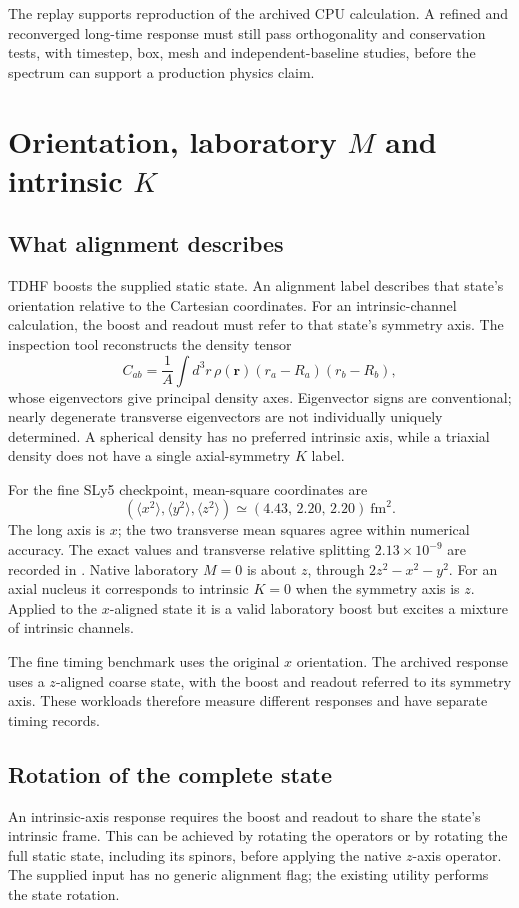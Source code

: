 \documentclass[11pt,a4paper]{article}
\newcommand{\ev}[1]{\path{#1.json}}
\newcommand{\sepsection}[1]{\FloatBarrier\section{#1}}
\begin{document}
The replay supports reproduction of the archived CPU calculation.
A refined and reconverged long-time response must still pass
orthogonality and conservation tests, with timestep, box, mesh and
independent-baseline studies, before the spectrum can support a
production physics claim.


\sepsection{Orientation, laboratory \texorpdfstring{$M$}{M} and intrinsic \texorpdfstring{$K$}{K}}
\label{sec:orientation}
\subsection{What alignment describes}
TDHF boosts the supplied static state. An alignment label describes that
state's orientation relative to the Cartesian coordinates. For an
intrinsic-channel calculation, the boost and readout must refer to that
state's symmetry axis.
The inspection tool reconstructs the density tensor
\begin{equation}
 C_{ab}=\frac{1}{A}\int d^3r\,\rho(\mathbf r)
 (r_a-R_a)(r_b-R_b),
\end{equation}
whose eigenvectors give principal density axes. Eigenvector signs are
conventional; nearly degenerate transverse eigenvectors are not individually
uniquely determined. A spherical density has no preferred intrinsic axis, while a
triaxial density does not have a single axial-symmetry $K$ label.

For the fine SLy5 checkpoint, mean-square coordinates are
\begin{equation}
 (\langle x^2\rangle,\langle y^2\rangle,\langle z^2\rangle)
 \simeq(4.43,\,2.20,\,2.20)\ \mathrm{fm}^2.
\end{equation}
The long axis is $x$; the two transverse mean squares agree within
numerical accuracy. The exact values and transverse relative splitting
$2.13\times10^{-9}$ are recorded in \ev{orientation}.
Native laboratory $M=0$ is about $z$, through
$2z^2-x^2-y^2$. For an axial nucleus it corresponds to intrinsic $K=0$
when the symmetry axis is $z$. Applied to the $x$-aligned state it is
a valid laboratory boost but excites a mixture of intrinsic channels.

The fine timing benchmark uses the original $x$ orientation. The
archived response uses a $z$-aligned coarse state, with the boost and
readout referred to its symmetry axis. These workloads therefore measure
different responses and have separate timing records.

\subsection{Rotation of the complete state}
An intrinsic-axis response requires the boost and readout to share the
state's intrinsic frame. This can be achieved by rotating the operators
or by rotating the full static state, including its spinors, before
applying the native $z$-axis operator. The supplied input has no generic
alignment flag; the existing utility performs the state rotation.
\end{document}

